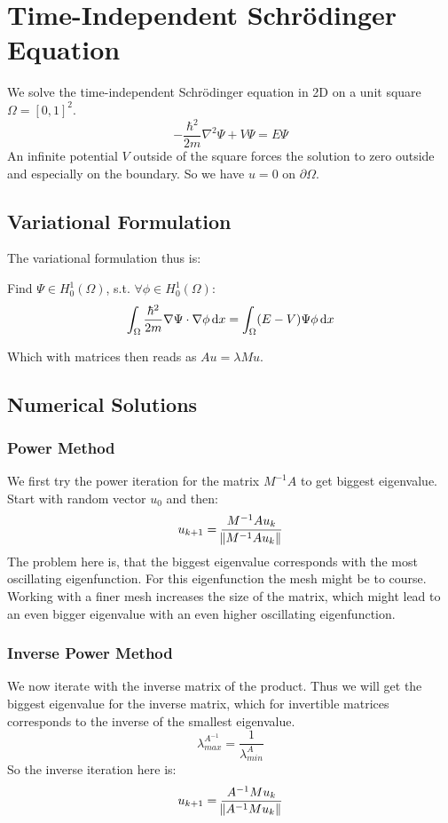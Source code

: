 \documentclass[a4paper,11pt]{scrartcl}
\newcommand*{\dx}{\dif{}x}
\begin{document}
\section{Time-Independent Schrödinger Equation}
We solve the time-independent Schrödinger equation in 2D on a unit square
$\Omega = [0,1]^2$.
\[ -\frac{\hbar^2}{2m} \nabla^2 \Psi + V \Psi = E \Psi\]
An infinite potential $V$ outside of the square forces the solution to zero
outside and especially on the boundary.
So we have $u = 0$ on $\partial\Omega$.

\subsection{Variational Formulation}
The variational formulation thus is:

Find $\Psi \in H^1_0(\Omega)$, s.t. $\forall \phi \in H^1_0(\Omega)$:
\[ \int_{\Omega} \frac{\hbar^2}{2m} \nabla \Psi \cdot \nabla\phi \dx =
  \int_{\Omega} (E - V) \Psi \phi\dx\]

Which with matrices then reads as $A u = \lambda M u$.

\subsection{Numerical Solutions}
\subsubsection{Power Method}
We first try the power iteration for the matrix $M^{-1} A$ to get biggest eigenvalue.
Start with random vector $u_0$ and then:
\[ u_{k+1} = \frac{M^{-1} A u_k}{\norm{M^{-1}Au_k}}\]
The problem here is, that the biggest eigenvalue corresponds with the most
oscillating eigenfunction.
For this eigenfunction the mesh might be to course.
Working with a finer mesh increases the size of the matrix, which might lead to
an even bigger eigenvalue with an even higher oscillating eigenfunction.

\subsubsection{Inverse Power Method}
We now iterate with the inverse matrix of the product.
Thus we will get the biggest eigenvalue for the inverse matrix, which for
invertible matrices corresponds to the inverse of the smallest eigenvalue.
\[ \lambda^{A^{-1}}_{max} = \frac{1}{\lambda^A_{min}} \]
So the inverse iteration here is:
\[ u_{k+1} = \frac{A^{-1} M u_k}{\norm{A^{-1}Mu_k}}\]
\end{document}
